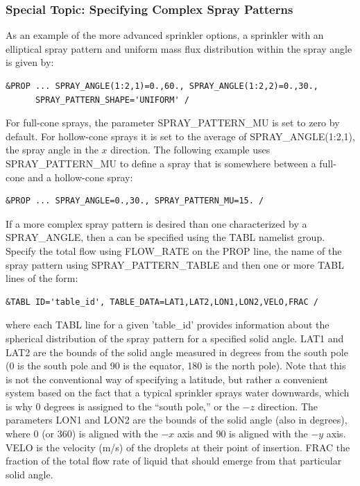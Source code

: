 \documentclass[11pt]{book}
\begin{document}
\subsubsection{Special Topic: Specifying Complex Spray Patterns}
\label{info:spraypattern}
\label{info:TABL}
\label{bucket_test_2}

As an example of the more advanced sprinkler options, a sprinkler with an elliptical spray pattern and uniform mass flux distribution within the spray angle is given by:
\begin{lstlisting}
&PROP ... SPRAY_ANGLE(1:2,1)=0.,60., SPRAY_ANGLE(1:2,2)=0.,30.,
      SPRAY_PATTERN_SHAPE='UNIFORM' /
\end{lstlisting}
For full-cone sprays, the parameter {\ct SPRAY\_PATTERN\_MU} is set to zero by default. For hollow-cone sprays it is set to the average of {\ct SPRAY\_ANGLE(1:2,1)}, the spray angle in the $x$ direction. The following example uses  {\ct SPRAY\_PATTERN\_MU} to define a spray that is somewhere between a full-cone and a hollow-cone spray:
\begin{lstlisting}
&PROP ... SPRAY_ANGLE=0.,30., SPRAY_PATTERN_MU=15. /
\end{lstlisting}
If a more complex spray pattern is desired than one characterized by a {\ct SPRAY\_ANGLE}, then a  can be specified using the {\ct TABL} namelist group. Specify the total flow using {\ct FLOW\_RATE} on the {\ct PROP} line, the name of the spray pattern using {\ct SPRAY\_PATTERN\_TABLE} and then one or more {\ct TABL} lines of the form:
\begin{lstlisting}
&TABL ID='table_id', TABLE_DATA=LAT1,LAT2,LON1,LON2,VELO,FRAC /
\end{lstlisting}
where each {\ct TABL} line for a given {\ct 'table\_id'} provides information about the spherical distribution of the spray pattern for a specified solid angle. {\ct LAT1} and {\ct LAT2} are the bounds of the solid angle measured in degrees from the south pole (0 is the south pole and 90 is the equator, 180 is the north pole).  Note that this is not the conventional way of specifying a latitude, but rather a convenient system based on the fact that a typical sprinkler sprays water downwards, which is why 0 degrees is assigned to the ``south pole,'' or the $-z$ direction. The parameters {\ct LON1} and {\ct LON2} are the bounds of the solid angle (also in degrees), where 0 (or 360) is aligned with the $-x$ axis and 90 is aligned with the $-y$ axis.  {\ct VELO} is the velocity (m/s) of the droplets at their point of insertion. {\ct FRAC} the fraction of the total flow rate of liquid that should emerge from that particular solid angle.
\end{document}
